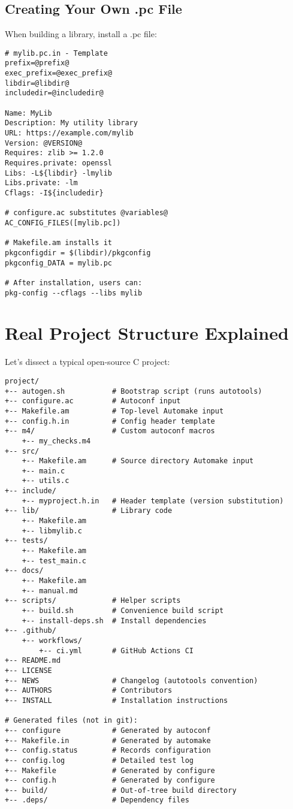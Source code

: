 \subsection{Creating Your Own .pc File}

When building a library, install a .pc file:

\begin{lstlisting}
# mylib.pc.in - Template
prefix=@prefix@
exec_prefix=@exec_prefix@
libdir=@libdir@
includedir=@includedir@

Name: MyLib
Description: My utility library
URL: https://example.com/mylib
Version: @VERSION@
Requires: zlib >= 1.2.0
Requires.private: openssl
Libs: -L${libdir} -lmylib
Libs.private: -lm
Cflags: -I${includedir}

# configure.ac substitutes @variables@
AC_CONFIG_FILES([mylib.pc])

# Makefile.am installs it
pkgconfigdir = $(libdir)/pkgconfig
pkgconfig_DATA = mylib.pc

# After installation, users can:
pkg-config --cflags --libs mylib
\end{lstlisting}

\section{Real Project Structure Explained}

Let's dissect a typical open-source C project:

\begin{lstlisting}
project/
+-- autogen.sh           # Bootstrap script (runs autotools)
+-- configure.ac         # Autoconf input
+-- Makefile.am          # Top-level Automake input
+-- config.h.in          # Config header template
+-- m4/                  # Custom autoconf macros
    +-- my_checks.m4
+-- src/
    +-- Makefile.am      # Source directory Automake input
    +-- main.c
    +-- utils.c
+-- include/
    +-- myproject.h.in   # Header template (version substitution)
+-- lib/                 # Library code
    +-- Makefile.am
    +-- libmylib.c
+-- tests/
    +-- Makefile.am
    +-- test_main.c
+-- docs/
    +-- Makefile.am
    +-- manual.md
+-- scripts/             # Helper scripts
    +-- build.sh         # Convenience build script
    +-- install-deps.sh  # Install dependencies
+-- .github/
    +-- workflows/
        +-- ci.yml       # GitHub Actions CI
+-- README.md
+-- LICENSE
+-- NEWS                 # Changelog (autotools convention)
+-- AUTHORS              # Contributors
+-- INSTALL              # Installation instructions

# Generated files (not in git):
+-- configure            # Generated by autoconf
+-- Makefile.in          # Generated by automake
+-- config.status        # Records configuration
+-- config.log           # Detailed test log
+-- Makefile             # Generated by configure
+-- config.h             # Generated by configure
+-- build/               # Out-of-tree build directory
+-- .deps/               # Dependency files
\end{lstlisting}

